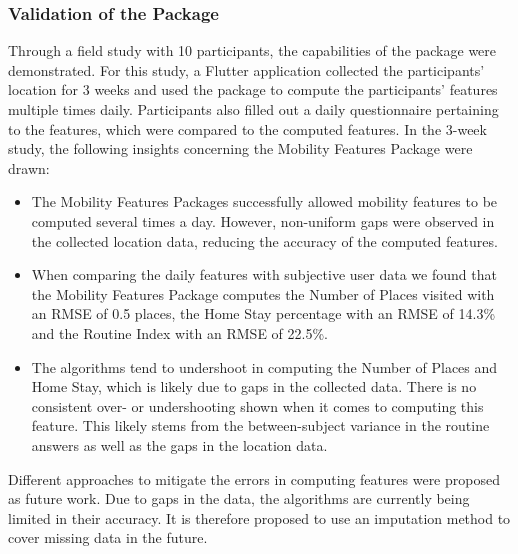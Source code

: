 \subsubsection*{Validation of the Package}
Through a field study with 10 participants, the capabilities of the package were demonstrated. For this study, a Flutter application collected the participants' location for 3 weeks and used the package to compute the participants' features multiple times daily. Participants also filled out a daily questionnaire pertaining to the features, which were compared to the computed features. In the 3-week study, the following insights concerning the Mobility Features Package were drawn:

\begin{itemize}
    \item The Mobility Features Packages successfully allowed mobility features to be computed several times a day. However, non-uniform gaps were observed in the collected location data, reducing the accuracy of the computed features. 
    
    \item When comparing the daily features with subjective user data we found that the Mobility Features Package computes the Number of Places visited with an RMSE of 0.5 places, the Home Stay percentage with an RMSE of 14.3\% and the Routine Index with an RMSE of 22.5\%.
    
    \item The algorithms tend to undershoot in computing the Number of Places and Home Stay, which is likely due to gaps in the collected data. There is no consistent over- or undershooting shown when it comes to computing this feature. This likely stems from the between-subject variance in the routine answers as well as the gaps in the location data.
\end{itemize}

Different approaches to mitigate the errors in computing features were proposed as future work. Due to gaps in the data, the algorithms are currently being limited in their accuracy. It is therefore proposed to use an imputation method to cover missing data in the future.